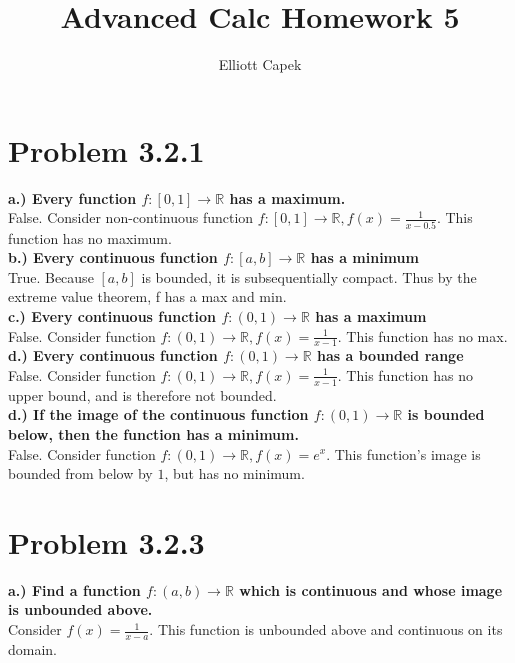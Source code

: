\documentclass[10pt]{article} %
\title{Advanced Calc Homework 5}
\author{Elliott Capek}
\begin{document}
\maketitle{}

\section{Problem 3.2.1}
\textbf{a.) Every function $f:[0,1] \rightarrow \mathbb{R}$ has a maximum.}\\
False. Consider non-continuous function $f:[0,1]\rightarrow\mathbb{R}, f(x) = \frac{1}{x-0.5}$. This function has no maximum.\\

\textbf{b.) Every continuous function $f:[a,b] \rightarrow \mathbb{R}$ has a minimum}\\
True. Because $[a,b]$ is bounded, it is subsequentially compact. Thus by the extreme value theorem, f has a max and min.\\

\textbf{c.) Every continuous function $f:(0,1) \rightarrow \mathbb{R}$ has a maximum}\\
False. Consider function $f:(0,1) \rightarrow \mathbb{R}, f(x) = \frac{1}{x-1}$. This function has no max.\\

\textbf{d.) Every continuous function $f:(0,1) \rightarrow \mathbb{R}$ has a bounded range}\\
False. Consider function $f:(0,1) \rightarrow \mathbb{R}, f(x) = \frac{1}{x-1}$. This function has no upper bound, and is therefore not bounded.\\

\textbf{d.) If the image of the continuous function $f:(0,1) \rightarrow \mathbb{R}$ is bounded below, then the function has a minimum.}\\
False. Consider function $f:(0,1) \rightarrow \mathbb{R}, f(x) = e^x$. This function's image is bounded from below by $1$, but has no minimum.\\

\section{Problem 3.2.3}
\textbf{a.) Find a function $f:(a,b)\rightarrow\mathbb{R}$ which is continuous and whose image is unbounded above.}\\
Consider $f(x) = \frac{1}{x-a}$. This function is unbounded above and continuous on its domain.\\
\end{document}
